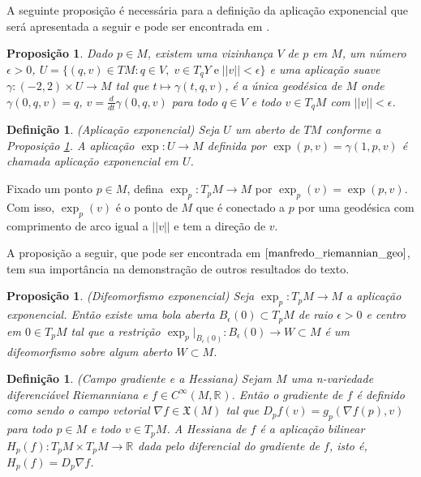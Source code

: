 \documentclass[12pt]{book}
\newtheorem{definicao}[teorema]{Definição}
\newtheorem{proposicao}[teorema]{Proposição}
\newcommand{\campossuaves}[1]{\mathfrak{X}(#1)}
\newcommand{\derivada}[2]{\frac{d #1}{d #2}}
\newcommand{\espacotangenteponto}[2]{T_{#1}#2}
\newcommand{\funcoessuaves}[1]{C^{\infty}(#1, \real{})}
\newcommand{\gradiente}{\nabla f}
\newcommand{\norma}[1]{||#1||}
\newcommand{\real}[1]{\mathbb{R}^{#1}}
\newcommand{\reta}{\real{}}
\begin{document}
	A seguinte proposição é necessária para a definição da aplicação exponencial que será apresentada a seguir e pode ser encontrada em \cite{manfredo_riemannian_geo}.
	
	\begin{proposicao}\label{proposicao_existencia_geodesica}
		Dado $p\in M$, existem uma vizinhança $V$ de $p$ em $M$, um número $\epsilon>0$, $U=\{(q, v) \in TM: q\in V,\;v\in \espacotangenteponto{q}{Y}\;\text{e}\;\norma{v}<\epsilon \}$ e uma aplicação suave $\gamma:(-2,2)\times U \to M$ tal que $t\mapsto \gamma(t, q, v)$, é a única geodésica de $M$ onde $\gamma(0, q, v)=q$, $v=\derivada{}{t}\gamma(0,q,v)$ para todo $q\in V$ e todo $v\in \espacotangenteponto{q}{M}$ com $\norma{v}<\epsilon$.
	\end{proposicao}
	
	\begin{definicao}\label{definicao_aplicacao_exponencial}
		(Aplicação exponencial) Seja $U$ um aberto de $TM$ conforme a Proposição \ref{proposicao_existencia_geodesica}. A aplicação $\exp:U \to M$ definida por $\exp(p,v) = \gamma(1, p,v)$ é chamada aplicação exponencial em $U$.
	\end{definicao}
	
	Fixado um ponto $p \in M$, defina $\exp_{p}:T_{p}M \to M$ por $\exp_{p}(v) = \exp(p,v)$. Com isso, $\exp_{p}(v)$ é o ponto de $M$ que é conectado a $p$ por uma geodésica com comprimento de arco igual a $\norma{v}$ e tem a direção de $v$.
	
	A proposição a seguir, que pode ser encontrada em $\cite{manfredo_riemannian_geo}$, tem sua importância na demonstração de outros resultados do texto.
	
	\begin{proposicao}\label{proposicao_difeomorfismo_exponencial}
		(Difeomorfismo exponencial) Seja  $\exp_{p}:T_{p}M \to M$ a aplicação exponencial. Então existe uma bola aberta $B_{\epsilon}(0) \subset \espacotangenteponto{p}{M}$ de raio $\epsilon>0$ e centro em $0 \in T_{p}M$ tal que a restrição $\exp_{p}|_{B_{\epsilon}(0)}:B_{\epsilon}(0) \to W \subset M$ é um difeomorfismo sobre algum aberto $W \subset M$.
	\end{proposicao}
	
	\begin{definicao}\label{definicao_gradiente_hessiana}
		(Campo gradiente e a Hessiana) Sejam $M$ uma n-variedade diferenciável Riemanniana e $f\in \funcoessuaves{M}$. Então o gradiente de $f$ é definido como sendo o campo vetorial $\gradiente \in \campossuaves{M}$ tal que $D_{p}f(v) = g_{p}(\gradiente(p), v)$ para todo $p\in M$ e todo $v \in T_{p}M$. A Hessiana de $f$ é a aplicação bilinear $H_{p}(f): T_{p}M\times T_{p}M \to \reta$ dada pelo diferencial do gradiente de $f$, isto é, $H_{p}(f) = D_{p}\gradiente$.
	\end{definicao}
	
\end{document}
